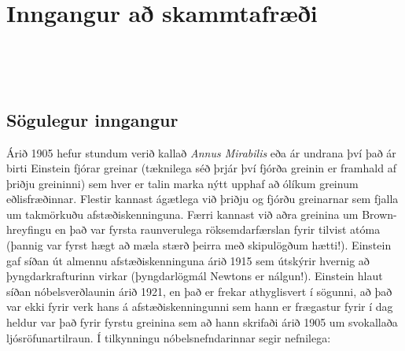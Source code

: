 \chapter{Inngangur að skammtafræði}



\begin{tcolorbox}

 \\

\vspace{-0.5cm}
\end{tcolorbox}

\begin{tcolorbox}

 \\

\vspace{-0.5cm}
\end{tcolorbox}

\section{Sögulegur inngangur}

Árið 1905 hefur stundum verið kallað \textit{Annus Mirabilis} eða ár undrana því það ár birti Einstein fjórar greinar (tæknilega séð þrjár því fjórða greinin er framhald af þriðju greininni) sem hver er talin marka nýtt upphaf að ólíkum greinum eðlisfræðinnar. Flestir kannast ágætlega við þriðju og fjórðu greinarnar sem fjalla um takmörkuðu afstæðiskenninguna. Færri kannast við aðra greinina um Brown-hreyfingu en það var fyrsta raunverulega röksemdarfærslan fyrir tilvist atóma (þannig var fyrst hægt að mæla stærð þeirra með skipulögðum hætti!). Einstein gaf síðan út almennu afstæðiskenninguna árið 1915 sem útskýrir hvernig að þyngdarkrafturinn virkar (þyngdarlögmál Newtons er nálgun!). Einstein hlaut síðan nóbelsverðlaunin árið 1921, en það er frekar athyglisvert í sögunni, að það var ekki fyrir verk hans á afstæðiskenningunni sem hann er frægastur fyrir í dag heldur var það fyrir fyrstu greinina sem að hann skrifaði árið 1905 um svokallaða ljósröfunartilraun. Í tilkynningu nóbelsnefndarinnar segir nefnilega: \\

